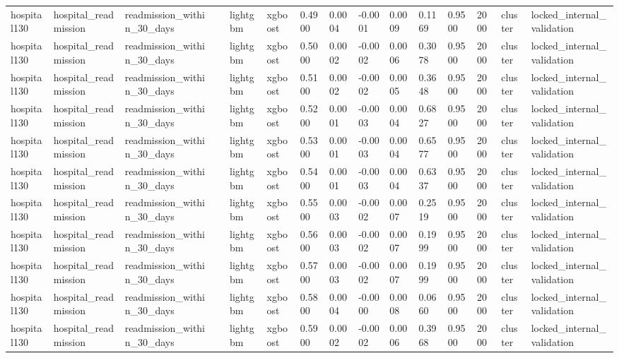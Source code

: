 \begin{tabular}{lllllllllllllll}
hospital130 & hospital\_readmission & readmission\_within\_30\_days &  & lightgbm & xgboost & 0.4900 & 0.0004 & -0.0001 & 0.0009 & 0.1169 & 0.9500 & 2000 & cluster & locked\_internal\_validation \\
hospital130 & hospital\_readmission & readmission\_within\_30\_days &  & lightgbm & xgboost & 0.5000 & 0.0002 & -0.0002 & 0.0006 & 0.3078 & 0.9500 & 2000 & cluster & locked\_internal\_validation \\
hospital130 & hospital\_readmission & readmission\_within\_30\_days &  & lightgbm & xgboost & 0.5100 & 0.0002 & -0.0002 & 0.0005 & 0.3648 & 0.9500 & 2000 & cluster & locked\_internal\_validation \\
hospital130 & hospital\_readmission & readmission\_within\_30\_days &  & lightgbm & xgboost & 0.5200 & 0.0001 & -0.0003 & 0.0004 & 0.6827 & 0.9500 & 2000 & cluster & locked\_internal\_validation \\
hospital130 & hospital\_readmission & readmission\_within\_30\_days &  & lightgbm & xgboost & 0.5300 & 0.0001 & -0.0003 & 0.0004 & 0.6577 & 0.9500 & 2000 & cluster & locked\_internal\_validation \\
hospital130 & hospital\_readmission & readmission\_within\_30\_days &  & lightgbm & xgboost & 0.5400 & 0.0001 & -0.0003 & 0.0004 & 0.6337 & 0.9500 & 2000 & cluster & locked\_internal\_validation \\
hospital130 & hospital\_readmission & readmission\_within\_30\_days &  & lightgbm & xgboost & 0.5500 & 0.0003 & -0.0002 & 0.0007 & 0.2519 & 0.9500 & 2000 & cluster & locked\_internal\_validation \\
hospital130 & hospital\_readmission & readmission\_within\_30\_days &  & lightgbm & xgboost & 0.5600 & 0.0003 & -0.0002 & 0.0007 & 0.1999 & 0.9500 & 2000 & cluster & locked\_internal\_validation \\
hospital130 & hospital\_readmission & readmission\_within\_30\_days &  & lightgbm & xgboost & 0.5700 & 0.0003 & -0.0002 & 0.0007 & 0.1999 & 0.9500 & 2000 & cluster & locked\_internal\_validation \\
hospital130 & hospital\_readmission & readmission\_within\_30\_days &  & lightgbm & xgboost & 0.5800 & 0.0004 & -0.0000 & 0.0008 & 0.0660 & 0.9500 & 2000 & cluster & locked\_internal\_validation \\
hospital130 & hospital\_readmission & readmission\_within\_30\_days &  & lightgbm & xgboost & 0.5900 & 0.0002 & -0.0002 & 0.0006 & 0.3968 & 0.9500 & 2000 & cluster & locked\_internal\_validation \\

\end{tabular}
